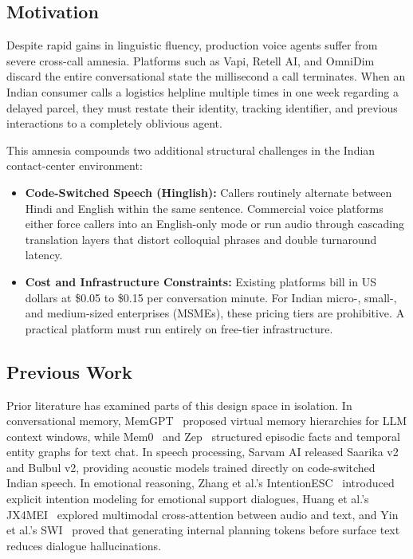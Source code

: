 \documentclass[conference]{IEEEtran}
\begin{document}
\subsection{Motivation}
Despite rapid gains in linguistic fluency, production voice agents suffer from severe cross-call amnesia. Platforms such as Vapi, Retell AI, and OmniDim discard the entire conversational state the millisecond a call terminates. When an Indian consumer calls a logistics helpline multiple times in one week regarding a delayed parcel, they must restate their identity, tracking identifier, and previous interactions to a completely oblivious agent. 

This amnesia compounds two additional structural challenges in the Indian contact-center environment:
\begin{itemize}
    \item \textbf{Code-Switched Speech (Hinglish):} Callers routinely alternate between Hindi and English within the same sentence. Commercial voice platforms either force callers into an English-only mode or run audio through cascading translation layers that distort colloquial phrases and double turnaround latency.
    \item \textbf{Cost and Infrastructure Constraints:} Existing platforms bill in US dollars at \$0.05 to \$0.15 per conversation minute. For Indian micro-, small-, and medium-sized enterprises (MSMEs), these pricing tiers are prohibitive. A practical platform must run entirely on free-tier infrastructure.
\end{itemize}

\subsection{Previous Work}
Prior literature has examined parts of this design space in isolation. In conversational memory, MemGPT~\cite{memgpt} proposed virtual memory hierarchies for LLM context windows, while Mem0~\cite{mem0} and Zep~\cite{zep} structured episodic facts and temporal entity graphs for text chat. In speech processing, Sarvam AI released Saarika v2 and Bulbul v2, providing acoustic models trained directly on code-switched Indian speech. In emotional reasoning, Zhang et al.'s IntentionESC~\cite{intentionesc} introduced explicit intention modeling for emotional support dialogues, Huang et al.'s JX4MEI~\cite{jx4mei} explored multimodal cross-attention between audio and text, and Yin et al.'s SWI~\cite{swi} proved that generating internal planning tokens before surface text reduces dialogue hallucinations.
\end{document}
